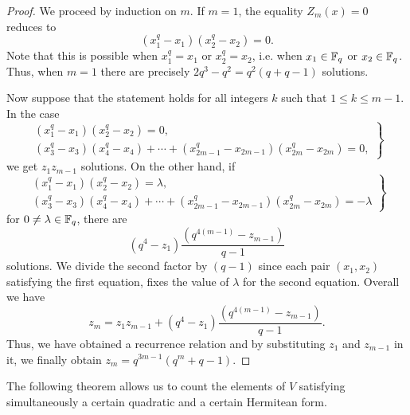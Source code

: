 \begin{proof}
		We proceed by induction on $m$. If $m=1$, the equality $Z_m(x)=0$ reduces to
		\begin{equation*}
			(x_1^q - x_1) (x_2^q - x_2) = 0.
		\end{equation*}
		Note that this is possible when $x_1^q = x_1$ or $x_2^q = x_2$, i.e. when
		$x_1 \in \mathbb{F}_q$ or $x_2 \in \mathbb{F}_q$. Thus, when $m=1$ there are precisely
		$2q^3-q^2 = q^2(q+q-1)$ solutions.

		Now suppose that the statement holds for all integers $k$ such that
		$1 \leqslant k \leqslant m-1$. In the case
		\begin{equation*}
			\left.
			\begin{array}{l}
				(x_1^q - x_1) (x_2^q - x_2) = 0, \\
				(x_3^q - x_3) (x_4^q - x_4) + \cdots + 
					(x_{2m-1}^q-x_{2m-1}) (x_{2m}^q - x_{2m}) = 0,
			\end{array}
			\right\}
		\end{equation*}
		we get $z_1 z_{m-1}$ solutions. On the other hand, if
		\begin{equation*}
			\left.
			\begin{array}{l}
				(x_1^q - x_1) (x_2^q - x_2) = \lambda, \\
				(x_3^q - x_3) (x_4^q - x_4) + \cdots + (x_{2m-1}^q-x_{2m-1})
						(x_{2m}^q - x_{2m}) = -\lambda
			\end{array}
			\right\}
		\end{equation*}
		for $0\neq \lambda \in \mathbb{F}_q$, there are 
		\begin{equation*}
			(q^4-z_1) \frac{(q^{4(m-1)}-z_{m-1})}{q-1}
		\end{equation*}
		solutions.
		We divide the second factor by $(q-1)$ since each pair $(x_1,x_2)$ satisfying the
		first equation, fixes the value of $\lambda$ for the second equation. Overall we have
		\begin{equation*}
			z_m = z_1 z_{m-1} + (q^4-z_1) \frac{(q^{4(m-1)}-z_{m-1})}{q-1}.
		\end{equation*}
		Thus, we have obtained a recurrence relation and by substituting $z_1$ and $z_{m-1}$ in
		it, we finally obtain $z_m = q^{3m-1}(q^m+q-1)$.
\end{proof}

The following theorem allows us to count the elements of $V$ satisfying simultaneously a 
certain quadratic and a certain Hermitean form.

